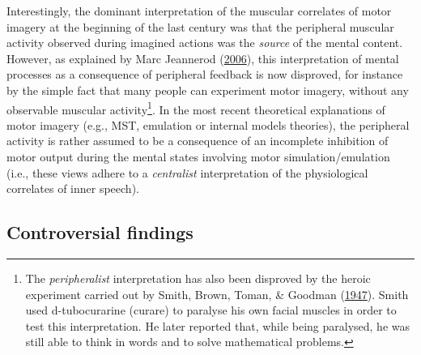 \documentclass[a4paper,12pt,twoside,openright,oldfontcommands]{memoir}
\let\rmarkdownfootnote\footnote%
\def\footnote{\protect\rmarkdownfootnote}
\begin{document}
Interestingly, the dominant interpretation of the muscular correlates of
motor imagery at the beginning of the last century was that the
peripheral muscular activity observed during imagined actions was the
\emph{source} of the mental content. However, as explained by Marc
Jeannerod (\protect\hyperlink{ref-jeannerod_motor_2006}{2006}), this
interpretation of mental processes as a consequence of peripheral
feedback is now disproved, for instance by the simple fact that many
people can experiment motor imagery, without any observable muscular
activity\footnote{The \emph{peripheralist} interpretation has also been
  disproved by the heroic experiment carried out by Smith, Brown, Toman,
  \& Goodman (\protect\hyperlink{ref-smith_lack_1947}{1947}). Smith used
  d-tubocurarine (curare) to paralyse his own facial muscles in order to
  test this interpretation. He later reported that, while being
  paralysed, he was still able to think in words and to solve
  mathematical problems.}. In the most recent theoretical explanations
of motor imagery (e.g., MST, emulation or internal models theories), the
peripheral activity is rather assumed to be a consequence of an
incomplete inhibition of motor output during the mental states involving
motor simulation/emulation (i.e., these views adhere to a
\emph{centralist} interpretation of the physiological correlates of
inner speech).

\subsection{Controversial findings}\label{controversial-findings}
\end{document}
